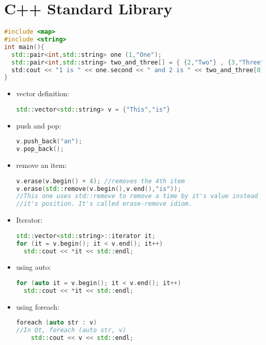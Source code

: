 \section{C++ Standard Library}
\begin{note}[Pair]
\begin{lstlisting}[language={c++}]
#include <map>
#include <string>
int main(){
  std::pair<int,std::string> one (1,"One");
  std::pair<int,std::string> two_and_three[] = { {2,"Two"} , {3,"Three"} };
  std:cout << "1 is " << one.second << " and 2 is " << two_and_three[0].second;
}
\end{lstlisting}
\end{note}
\begin{note}
\begin{itemize}
\item vector definition:
\begin{lstlisting}[language={c++}]
std::vector<std::string> v = {"This","is"}
\end{lstlisting}
\item push and pop:
\begin{lstlisting}[language={c++}]
v.push_back("an");
v.pop_back();
\end{lstlisting}
\item remove an item:
\begin{lstlisting}[language={c++}]
v.erase(v.begin() + 4); //removes the 4th item
v.erase(std::remove(v.begin(),v.end(),"is"));
//This one uses std::remove to remove a time by it's value instead of 
//it's position. It's called erase-remove idiom.
\end{lstlisting}
\item Iterator:
\begin{lstlisting}[language={c++}]
std::vector<std::string>::iterator it;
for (it = v.begin(); it < v.end(); it++)
  std::cout << *it << std::endl;
\end{lstlisting}
\item using auto:
\begin{lstlisting}[language={c++}]
for (auto it = v.begin(); it < v.end(); it++)
  std::cout << *it << std::endl;
\end{lstlisting}
\item using foreach:
\begin{lstlisting}[language={c++}]
foreach (auto str : v)
//In Qt, foreach (auto str, v)
	std::cout << v << std::endl;
\end{lstlisting}
\end{itemize}
\end{note}